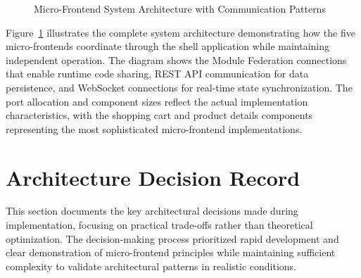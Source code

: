 \documentclass[12pt,a4paper]{report}
\begin{document}
\begin{figure}[htbp]
{
}
\caption{Micro-Frontend System Architecture with Communication Patterns}
\label{fig:system-architecture}
\end{figure}

Figure~\ref{fig:system-architecture} illustrates the complete system architecture demonstrating how the five micro-frontends coordinate through the shell application while maintaining independent operation. The diagram shows the Module Federation connections that enable runtime code sharing, REST API communication for data persistence, and WebSocket connections for real-time state synchronization. The port allocation and component sizes reflect the actual implementation characteristics, with the shopping cart and product details components representing the most sophisticated micro-frontend implementations.

\section{Architecture Decision Record}

This section documents the key architectural decisions made during implementation, focusing on practical trade-offs rather than theoretical optimization. The decision-making process prioritized rapid development and clear demonstration of micro-frontend principles while maintaining sufficient complexity to validate architectural patterns in realistic conditions.
\end{document}
